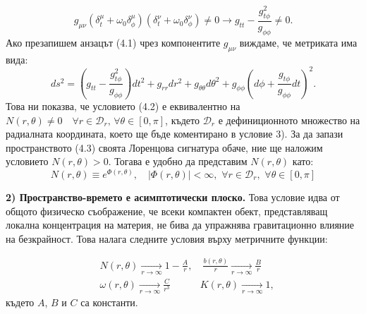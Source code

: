 \begin{equation}
g_{\mu\nu} (\delta_t^\mu + \omega_0\delta^\mu_\phi) (\delta_t^\nu + \omega_0\delta^\nu_\phi) \ne 0 \rightarrow g_{tt} - \frac{g_{t\phi}^2}{g_{\phi\phi}} \ne 0.
\end{equation}\newline
Ако презапишем анзацът (4.1) чрез компонентите $g_{\mu\nu}$ виждаме, че метриката има вида:
\begin{equation}
	ds^2 = \left(g_{tt} - \frac{g_{t\phi}^2}{g_{\phi\phi}}\right)dt^2 + g_{rr}dr^2 + g_{\theta\theta}d\theta^2 + g_{\phi\phi}\left(d\phi + \frac{g_{t\phi}}{g_{\phi\phi}}dt\right)^2.
\end{equation}
Това ни показва, че условието (4.2) е еквивалентно на $N(r,\theta)\ne 0\quad \forall r\in\mathcal{D}_r,\,\forall \theta\in[0,\pi]$, където $\mathcal{D}_r$ е дефиниционното множество на радиалната координата, което ще бъде коментирано в условие 3). За да запази пространството (4.3) своята Лоренцова сигнатура обаче, ние ще наложим условието $N(r,\theta) > 0$. Тогава е удобно да представим $N(r,\theta)$ като:
\begin{equation}
	N(r,\theta) \equiv e^{\Phi(r,\theta)}, \quad |\Phi(r,\theta)| < \infty,\,\, \forall r\in\mathcal{D}_r,\,\,\forall\theta\in[0,\pi]
\end{equation}

\noindent\textbf{2) Пространство-времето е асимптотически плоско.} Това условие идва от общото физическо съображение, че всеки компактен обект, представляващ локална концентрация на материя, не бива да упражнява гравитационно влияние на безкрайност. Това налага следните условия върху метричните функции:

\begin{equation}
	\begin{aligned}
		&N(r,\theta) \xrightarrow[r\rightarrow\infty]{} 1 - \frac{A}{r},\quad \frac{b(r,\theta)}{r} \xrightarrow[r\rightarrow\infty]{} \frac{B}{r} \\
		&\omega(r,\theta)\xrightarrow[r\rightarrow\infty]{} \frac{C}{r^3}\quad\qquad  K(r,\theta) \xrightarrow[r\rightarrow\infty]{} 1,
	\end{aligned}
\end{equation}
където $A$, $B$ и $C$ са константи.

